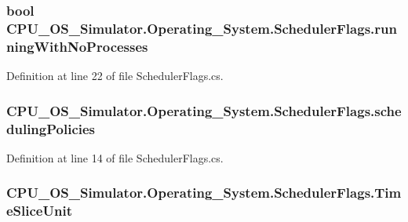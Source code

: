 \subsubsection[{running\+With\+No\+Processes}]{\setlength{\rightskip}{0pt plus 5cm}bool C\+P\+U\+\_\+\+O\+S\+\_\+\+Simulator.\+Operating\+\_\+\+System.\+Scheduler\+Flags.\+running\+With\+No\+Processes}\label{struct_c_p_u___o_s___simulator_1_1_operating___system_1_1_scheduler_flags_a1a46dce1e8818f1dae579c00eed21ad1}


Definition at line 22 of file Scheduler\+Flags.\+cs.

\hypertarget{struct_c_p_u___o_s___simulator_1_1_operating___system_1_1_scheduler_flags_a2461410563876df6082b78db986c6bf1}{}
\subsubsection[{scheduling\+Policies}]{ C\+P\+U\+\_\+\+O\+S\+\_\+\+Simulator.\+Operating\+\_\+\+System.\+Scheduler\+Flags.\+scheduling\+Policies}\label{struct_c_p_u___o_s___simulator_1_1_operating___system_1_1_scheduler_flags_a2461410563876df6082b78db986c6bf1}


Definition at line 14 of file Scheduler\+Flags.\+cs.

\hypertarget{struct_c_p_u___o_s___simulator_1_1_operating___system_1_1_scheduler_flags_af668afafedff1a596fff642d2fcd38b7}{}
\subsubsection[{Time\+Slice\+Unit}]{ C\+P\+U\+\_\+\+O\+S\+\_\+\+Simulator.\+Operating\+\_\+\+System.\+Scheduler\+Flags.\+Time\+Slice\+Unit}\label{struct_c_p_u___o_s___simulator_1_1_operating___system_1_1_scheduler_flags_af668afafedff1a596fff642d2fcd38b7}



